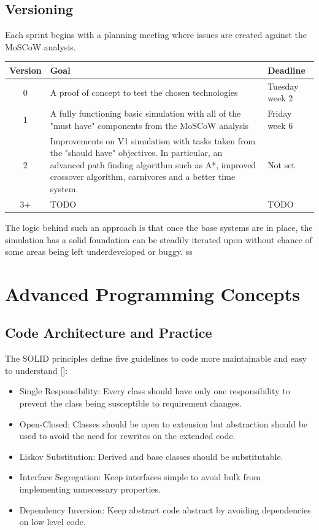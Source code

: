 \documentclass{ueacmpstyle}
\begin{document}
\subsection{Versioning}\label{versioning}
Each sprint begins with a planning meeting where issues are created against the MoSCoW analysis.

	\begin{tabular}{c|p{}|l}
		Version & Goal & Deadline \\ \hline
		0 & A proof of concept to test the chosen technologies & Tuesday week 2 \\ \hline
		1 & A fully functioning basic simulation with all of the "must have" components from the MoSCoW analysis & Friday week 6 \\ \hline
		2 & Improvements on V1 simulation with tasks taken from the "should have" objectives. In particular, an advanced path finding algorithm such as A*, improved crossover algorithm, carnivores and a better time system. & Not set\\ \hline
		3+ & TODO & TODO \
	\end{tabular}
		
The logic behind such an approach is that once the base systems are in place, the simulation has a solid foundation can be steadily iterated upon without chance of some areas being left underdeveloped or buggy.
ss
\section{Advanced Programming Concepts}

\subsection{Code Architecture and Practice}
The SOLID principles define five guidelines to code more maintainable and easy to understand [\cite{kelmendi}]: 
\begin{itemize}
	\item Single Responsibility: Every class should have only one responsibility to prevent the class being susceptible to requirement changes.
	\item Open-Closed: Classes should be open to extension but abstraction should be used to avoid the need for rewrites on the extended code.
	\item Liskov Substitution: Derived and base classes should be substitutable.
	\item Interface Segregation: Keep interfaces simple to avoid bulk from implementing unnecessary properties.
	\item Dependency Inversion: Keep abstract code abstract by avoiding dependencies on low level code.
\end{itemize}
\end{document}
